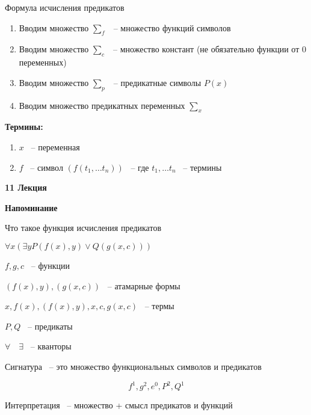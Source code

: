 \documentclass[russian]{lecture-notes}
\begin{document}
    \begin{definition}
        Формула исчисления предикатов

        \begin{enumerate}
            \item{
                Вводим множество $\sum_f$ ~-- множество функций символов
            }
            \item{
                Вводим множество $\sum_c$ ~-- множество констант (не обязательно функции от 0 переменных)
            }
            \item{
                Вводим множество $\sum_p$ ~-- предикатные символы $P(x)$
            }
            \item{
                Вводим множество предикатных переменных $\sum_x$
            }
        \end{enumerate}

        \textbf{Термины:}

        \begin{enumerate}
            \item $x$ ~-- переменная
            \item{
                $f$ ~-- символ $(f(t_1, \dots t_n))$ ~-- где $t_1, \dots t_n$ ~-- термины
            }
        \end{enumerate}
    \end{definition}



    \textbf{11 Лекция}

    \textbf{Напоминание}

    Что такое функция исчисления предикатов

    $\forall x (\exists y P(f(x), y) \lor Q(g(x, c)))$

    $f, g, c$ ~-- функции

    $(f(x), y), (g(x, c))$ ~-- атамарные формы

    $x, f(x), (f(x),y), x, c, g(x, c)$ ~-- термы

    $P, Q$ ~-- предикаты

    $\forall \quad \exists$ ~-- кванторы

    \begin{definition}
        Сигнатура ~-- это множество функциональных символов и предикатов

        $${ f^1, g^2, e^0, P^2, Q^1}$$
    \end{definition}

    \begin{definition}
        Интерпретация ~-- множество + смысл предикатов и функций
    \end{definition}
\end{document}
